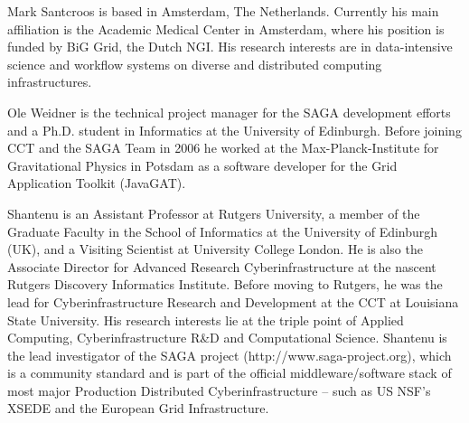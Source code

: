 \documentclass[]{paper}
\begin{document}
Mark Santcroos is based in Amsterdam, The Netherlands. Currently his main
affiliation is the Academic Medical Center in Amsterdam, where his position is
funded by BiG Grid, the Dutch NGI. His research interests are in
data-intensive science and workflow systems on diverse and distributed
computing infrastructures.

Ole Weidner is the technical project manager for the SAGA development efforts
and a Ph.D. student in Informatics at the University of Edinburgh. Before
joining CCT and the SAGA Team in 2006 he worked at the Max-Planck-Institute
for Gravitational Physics in Potsdam as a software developer for the Grid
Application Toolkit (JavaGAT).

Shantenu is an Assistant Professor at Rutgers University, a member of
the Graduate Faculty in the School of Informatics at the University of
Edinburgh (UK), and a Visiting Scientist at University College
London. He is also the Associate Director for Advanced Research
Cyberinfrastructure at the nascent Rutgers Discovery Informatics
Institute. Before moving to Rutgers, he was the lead for
Cyberinfrastructure Research and Development at the CCT at Louisiana
State University.  His research interests lie at the triple point of
Applied Computing, Cyberinfrastructure R\&D and Computational
Science. Shantenu is the lead investigator of the SAGA project
(http://www.saga-project.org), which is a community standard and is
part of the official middleware/software stack of most major
Production Distributed Cyberinfrastructure -- such as US NSF's XSEDE
and the European Grid Infrastructure.  





\end{document}
